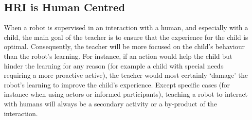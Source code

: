 
\subsection{HRI is Human Centred}

When a robot is supervised in an interaction with a human, and especially with a child, the main goal of the teacher is to ensure that the experience for the child is optimal. Consequently, the teacher will be more focused on the child's behaviour than the robot's learning. For instance, if an action would help the child but hinder the learning for any reason (for example a child with special needs requiring a more proactive active), the teacher would most certainly `damage' the robot's learning to improve the child's experience. Except specific cases (for instance when using actors or informed participants), teaching a robot to interact with humans will always be a secondary activity or a by-product of the interaction. 

